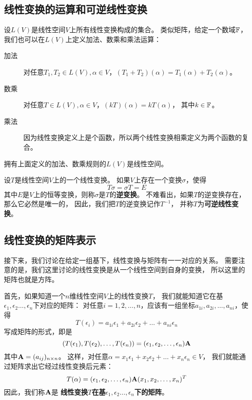 \subsection{线性变换的运算和可逆线性变换}
设$L(V)$是线性空间$V$上所有线性变换构成的集合。
类似矩阵，给定一个数域$\mathbb{F}$，
我们也可以在$L(V)$上定义加法、数乘和乘法运算：
\begin{description}
  \item[加法]
  对任意$T_1,T_2\in L(V),\alpha\in V$，$(T_1+T_2)(\alpha)=T_1(\alpha)+T_2(\alpha)$。
  \item[数乘]
  对任意$T\in L(V),\alpha\in V$，$(kT)(\alpha)=kT(\alpha)$，
  其中$k\in\mathbb{F}$。
  \item[乘法]
  因为线性变换定义上是个函数，所以两个线性变换相乘定义为两个函数的复合。
\end{description}

\begin{theorem}
  拥有上面定义的加法、数乘规则的$L(V)$是线性空间。
\end{theorem}

\begin{definition}[可逆线性变换]
  设$T$是线性空间$V$上的一个线性变换。
  如果$V$上存在一个变换$\sigma$，使得
  \[ T\sigma = \sigma T = E \]
  其中$E$是$V$上的恒等变换，则称$\sigma$是$T$的\textbf{逆变换}。
  不难看出，如果$T$的逆变换存在，那么它必然是唯一的，
  因此，我们把$T$的逆变换记作$T^{-1}$，
  并称$T$为\textbf{可逆线性变换}。
\end{definition}

\subsection{线性变换的矩阵表示}
接下来，我们讨论在给定一组基下，线性变换与矩阵有一一对应的关系。
需要注意的是，我们这里讨论的线性变换是从一个线性空间到自身的变换，
所以这里的矩阵也就是方阵。

首先，如果知道一个$n$维线性空间$V$上的线性变换$T$，
我们就能知道它在基$\epsilon_1,\epsilon_2\dots,\epsilon_n$下对应的矩阵：
对任意$i=1,2,\dots,n$，应该有一组坐标$a_{1i},a_{2i},\dots,a_{ni}$，使得
\[ T(\epsilon_i) = a_{1i}\epsilon_1+a_{2i}\epsilon_2+\dots+a_{ni}\epsilon_n \]
写成矩阵的形式，即是
\[ (T(\epsilon_1), T(\epsilon_2),\dots,T(\epsilon_n)) =
  (\epsilon_1,\epsilon_2,\dots,\epsilon_n)\mathbf{A} \]
其中$\mathbf{A}=(a_{ij})_{n\times n}$。
这样，对任意$\alpha=x_1\epsilon_1+x_2\epsilon_2+\dots+x_n\epsilon_n\in V$，
我们就能通过矩阵求出它经过线性变换后元素：
\[ T(\alpha)=(\epsilon_1,\epsilon_2,\dots,\epsilon_n)\mathbf{A}
  (x_1,x_2,\dots,x_n)^T \]
因此，我们称$\mathbf{A}$是
\textbf{线性变换$T$在基$\epsilon_1,\epsilon_2\dots,\epsilon_n$下的矩阵}。


